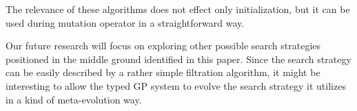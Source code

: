 \documentclass[conference]{IEEEtran}
\newcommand{\red}[1]{{\color{red} #1}}
\begin{document}

The relevance of these algorithms does not effect only initialization, but it can be used during mutation
operator in a straightforward way. 

Our future research will focus on exploring other possible search strategies positioned in the middle ground 
identified in this paper. Since the search strategy can be easily described by a rather simple filtration algorithm, it might be
interesting to allow the typed GP system to evolve the search strategy it 
utilizes in a kind of meta-evolution way. 








\end{document}
